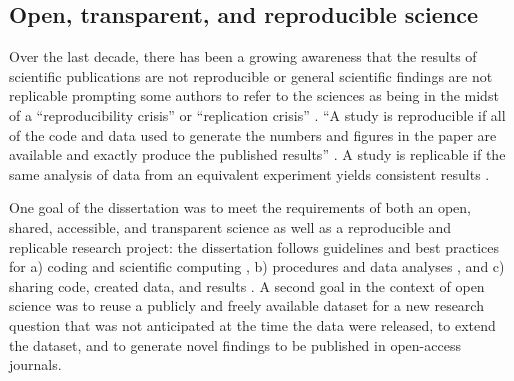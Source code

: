 \subsection{Open, transparent, and reproducible science}

Over the last decade, there has been a growing awareness that the results of
scientific publications are not reproducible or general scientific findings are
not replicable prompting some authors to refer to the sciences as being in the
midst of a ``reproducibility crisis'' or ``replication crisis''
\citep{baker2016reproducibility, plesser2018reproducibility,
stupple2019reproducibility, nosek2022replicability}.
``A study is reproducible if all of the code and data used to generate the
numbers and figures in the paper are available and exactly produce the published
results'' \citep[][p. 111]{leek2017most}.
A study is replicable if the same analysis of data from an equivalent experiment
yields consistent results \citep{dubois2016building, leek2017most}.

%
One goal of the dissertation was to meet the requirements of both an open,
shared, accessible, and transparent science \citep[cf.][]{watson2015will,
fecher2014open} as well as a reproducible and replicable research project:
%
the dissertation follows guidelines and best practices for a) coding and
scientific computing \citep{wilson2014best}, b) procedures and data analyses
\citep{nichols2017best, poldrack2017scanning, poldrack2019establishment}, and c)
sharing code, created data, and results \citep{eglen2017toward, nichols2017best,
pernet2015improving}.
A second goal in the context of open science was to reuse a publicly and freely
available dataset for a new research question that was not anticipated at the
time the data were released, to extend the dataset, and to generate novel
findings to be published in open-access journals.

